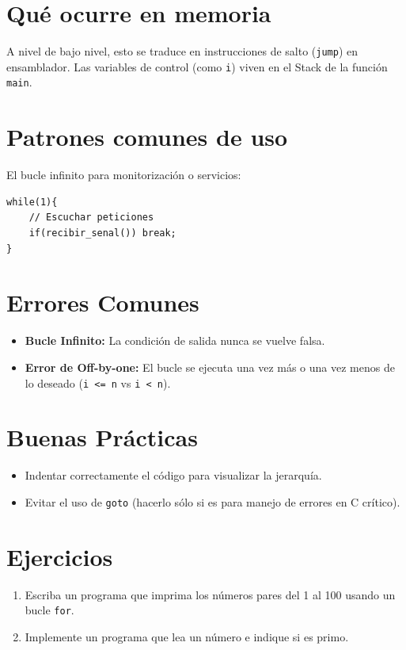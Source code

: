 \documentclass[12pt,a4paper]{article}
\begin{document}
\section{Qué ocurre en memoria}
A nivel de bajo nivel, esto se traduce en instrucciones de salto (\texttt{jump}) en ensamblador. Las variables de control (como \texttt{i}) viven en el Stack de la función \texttt{main}.

\section{Patrones comunes de uso}
El bucle infinito para monitorización o servicios:
\begin{lstlisting}
while(1){
    // Escuchar peticiones
    if(recibir_senal()) break;
}
\end{lstlisting}

\section{Errores Comunes}
\begin{itemize}
    \item \textbf{Bucle Infinito:} La condición de salida nunca se vuelve falsa.
    \item \textbf{Error de Off-by-one:} El bucle se ejecuta una vez más o una vez menos de lo deseado (\texttt{i <= n} vs \texttt{i < n}).
\end{itemize}

\section{Buenas Prácticas}
\begin{itemize}
    \item Indentar correctamente el código para visualizar la jerarquía.
    \item Evitar el uso de \texttt{goto} (hacerlo sólo si es para manejo de errores en C crítico).
\end{itemize}

\section{Ejercicios}
\begin{enumerate}
    \item Escriba un programa que imprima los números pares del 1 al 100 usando un bucle \texttt{for}.
    \item Implemente un programa que lea un número e indique si es primo.
\end{enumerate}
\end{document}
